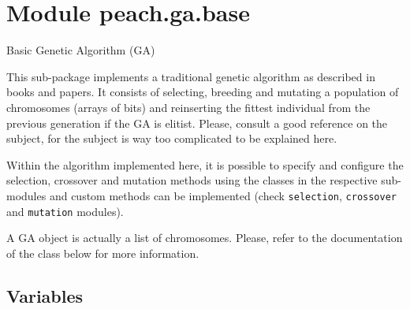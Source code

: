 %
%
%


\section{Module peach.ga.base}

    \label{peach:ga:base}

Basic Genetic Algorithm (GA)

This sub-package implements a traditional genetic algorithm as described in
books and papers. It consists of selecting, breeding and mutating a population
of chromosomes (arrays of bits) and reinserting the fittest individual from the
previous generation if the GA is elitist. Please, consult a good reference on
the subject, for the subject is way too complicated to be explained here.

Within the algorithm implemented here, it is possible to specify and configure
the selection, crossover and mutation methods using the classes in the
respective sub-modules and custom methods can be implemented (check
\texttt{selection}, \texttt{crossover} and \texttt{mutation} modules).

A GA object is actually a list of chromosomes. Please, refer to the
documentation of the class below for more information.


  \subsection{Variables}

